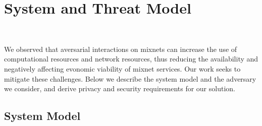 \section{System and Threat Model}~\label{sec:sys_model}

We observed that aversarial interactions on mixnets can increase the use of
computational resources and network resources, thus reducing the
availability and negatively affecting evonomic viability of mixnet
services. Our work seeks to mitigate these challenges. Below we describe
the system model and the adversary we consider, and derive privacy and
security requirements for our solution.

\subsection{System Model}

